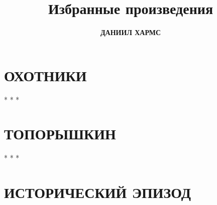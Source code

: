 \documentclass[a4paper,12pt]{article}
\author{\LARGE \textbf{ДАНИИЛ ХАРМС}}
\title{Избранные произведения}
\date{}
\begin{document}
\maketitle

\section*{\centering \normalsize ОХОТНИКИ}


\begin{center}
        * * *
    \end{center}

\section*{\centering {} ТОПОРЫШКИН}


\begin{center}
        * * *
    \end{center}

\section*{\centering \normalsize ИСТОРИЧЕСКИЙ ЭПИЗОД}
\bigskip

\end{document}
